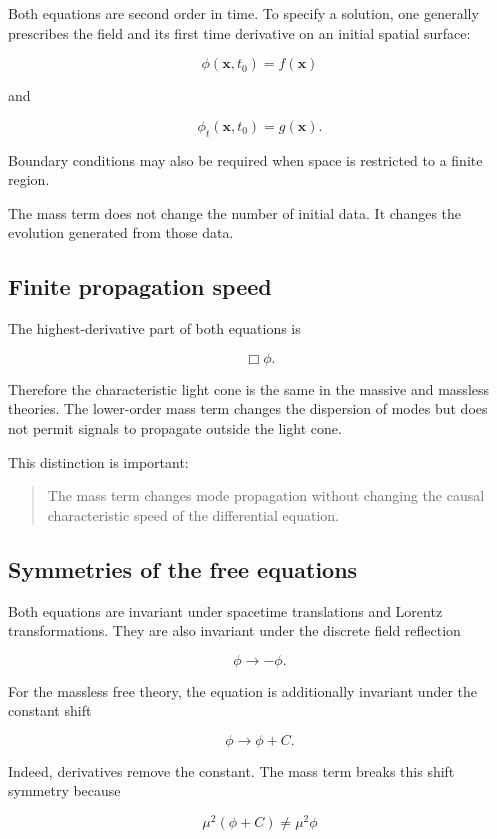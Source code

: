 Both equations are second order in time. To specify a solution, one generally prescribes the field and its first time derivative on an initial spatial surface:

\[
\boxed{
\phi(\mathbf{x},t_{0})
=
f(\mathbf{x})
}
\]

and

\[
\boxed{
\phi_{t}(\mathbf{x},t_{0})
=
g(\mathbf{x})
}.
\]

Boundary conditions may also be required when space is restricted to a finite region.

The mass term does not change the number of initial data. It changes the evolution generated from those data.

\subsection{Finite propagation speed}

The highest-derivative part of both equations is

\[
\Box\phi.
\]

Therefore the characteristic light cone is the same in the massive and massless theories. The lower-order mass term changes the dispersion of modes but does not permit signals to propagate outside the light cone.

This distinction is important:

\begin{quote}
The mass term changes mode propagation without changing the causal characteristic speed of the differential equation.
\end{quote}

\subsection{Symmetries of the free equations}

Both equations are invariant under spacetime translations and Lorentz transformations. They are also invariant under the discrete field reflection

\[
\boxed{
\phi\longrightarrow-\phi
}.
\]

For the massless free theory, the equation is additionally invariant under the constant shift

\[
\boxed{
\phi\longrightarrow\phi+C
}.
\]

Indeed, derivatives remove the constant. The mass term breaks this shift symmetry because

\[
\mu^{2}(\phi+C)
\neq
\mu^{2}\phi
\]

